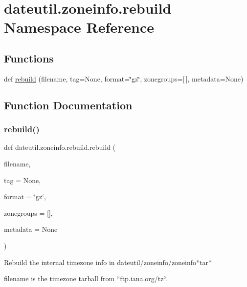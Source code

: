 \hypertarget{namespacedateutil_1_1zoneinfo_1_1rebuild}{}\section{dateutil.\+zoneinfo.\+rebuild Namespace Reference}
\label{namespacedateutil_1_1zoneinfo_1_1rebuild}
\subsection*{Functions}
\begin{DoxyCompactItemize}
\item 
def \hyperlink{namespacedateutil_1_1zoneinfo_1_1rebuild_a53532d6d75533a49aebb5d75c4e1b129}{rebuild} (filename, tag=None, format=\char`\"{}gz\char`\"{}, zonegroups=\mbox{[}$\,$\mbox{]}, metadata=None)
\end{DoxyCompactItemize}


\subsection{Function Documentation}
\mbox{\label{namespacedateutil_1_1zoneinfo_1_1rebuild_a53532d6d75533a49aebb5d75c4e1b129}} 
\subsubsection{\texorpdfstring{rebuild()}{rebuild()}}
{\footnotesize\ttfamily def dateutil.\+zoneinfo.\+rebuild.\+rebuild (\begin{DoxyParamCaption}\item[{}]{filename,  }\item[{}]{tag = {\ttfamily None},  }\item[{}]{format = {\ttfamily \char`\"{}gz\char`\"{}},  }\item[{}]{zonegroups = {\ttfamily \mbox{[}\mbox{]}},  }\item[{}]{metadata = {\ttfamily None} }\end{DoxyParamCaption})}

\begin{DoxyVerb}Rebuild the internal timezone info in dateutil/zoneinfo/zoneinfo*tar*

filename is the timezone tarball from ``ftp.iana.org/tz``.\end{DoxyVerb}
 